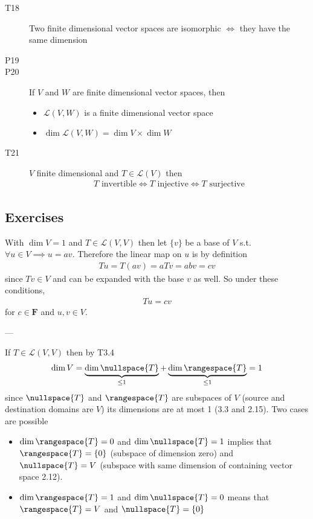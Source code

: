 \begin{description}
  \item[T18] Two finite dimensional vector spaces are isomorphic $\iff$ they have the same dimension
  
  \item[P19]
  
  \item[P20\label{itm:P3_20}] If $V$ and $W$ are finite dimensional vector spaces, then
  \begin{itemize}
  \item $\mathcal{L}(V,W)$ is a finite dimensional vector space
  \item $\dim{\mathcal{L}(V,W)} = \dim{V} \times \dim{W}$
  \end{itemize}
  
  \item[T21\label{itm:T3_21}] $V$ finite dimensional and $T\in\mathcal{L}(V)$ then
  \begin{align*}
  T \text{ invertible} \iff T \text{ injective} \iff T \text{ surjective} 
  \end{align*}
  
  
\end{description}
  
  
\subsection*{Exercises}
\setcounter{paragraph}{0}

\exo{} With $\dim{V}=1$ and $T\in\mathcal{L}(V,V)$ then let $\{v\}$ be a base of $V$ s.t. $\forall u\in V \implies u=av$. 
Therefore the linear map on $u$ is by definition
\begin{align*}
  Tu = T(av) = a Tv = abv = cv
\end{align*}
since $Tv \in V$ and can be expanded with the base $v$ as well. So under these conditions, 
\begin{align*}
  Tu = c v
\end{align*}
for $c\in\mathbf{F}$ and $u,v\in V$.

---

If $T \in \mathcal{L}(V,V)$ then by T3.4
\begin{align*}
\dim{V} = \underbrace{\dim{\nullspace{T}}}_{\leq 1} + \underbrace{\dim{\rangespace{T}}}_{\leq 1} = 1
\end{align*}
since $\nullspace{T}$ and $\rangespace{T}$ are subspaces of $V$ (source and destination domains are $V$) its dimensions are at most 1 (3.3 and 2.15). Two cases are possible
\begin{itemize}
\item $\dim{\rangespace{T}}=0$ and $\dim{\nullspace{T}}=1$ implies that $\rangespace{T}=\{0\}$ (subspace of dimension zero) and $\nullspace{T}=V$ (subspace with same dimension of containing vector space 2.12).
\item $\dim{\rangespace{T}}=1$ and $\dim{\nullspace{T}}=0$ means that $\rangespace{T}=V$ and $\nullspace{T}=\{0\}$ 
\end{itemize}

